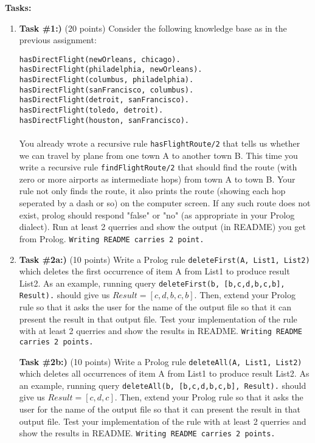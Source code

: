 \documentclass[paper=letter, fontsize=11pt]{scrartcl} %
\begin{document}
    \textbf{Tasks:}
    \begin{enumerate}


        \item \textbf{Task \#1:)} (20 points) Consider the following knowledge base as in the previous assignment:

        \texttt{hasDirectFlight(newOrleans, chicago).\\
        hasDirectFlight(philadelphia, newOrleans).\\
        hasDirectFlight(columbus, philadelphia).\\
        hasDirectFlight(sanFrancisco, columbus).\\
        hasDirectFlight(detroit, sanFrancisco).\\
        hasDirectFlight(toledo, detroit).\\
        hasDirectFlight(houston, sanFrancisco).\\
        } \\

        You already wrote a recursive rule \texttt{hasFlightRoute/2} that tells us whether we can travel by plane from one town A to another town B. 
This time you write a recursive rule \texttt{findFlightRoute/2} that should find the route (with zero or more airports as intermediate hops) 
from town A to town B. Your rule not only finds the route, it also prints the route 
(showing each hop seperated by a dash or so) on the computer screen. 
If any such route does not exist, prolog should respond "false" or "no" (as appropriate in your Prolog dialect). 
Run at least 2 querries and show the output (in README) you get from Prolog. \texttt{Writing README carries 2 point.} 

\item \textbf{Task \#2a:)} (10 points) Write a Prolog rule \texttt{deleteFirst(A, List1, List2)} 
which deletes the first occurrence of item A from List1 to produce result List2. 
As an example, running query \texttt{deleteFirst(b, [b,c,d,b,c,b], Result).} should give us $Result = [c, d, b, c, b]$. 
Then, extend your Prolog rule so that it asks the user for the name of the output file so 
that it can present the result in that output file. 
Test your implementation of the rule with at least 2 querries and show the results in README. \texttt{Writing README carries 2 points.}

\textbf{Task \#2b:)} (10 points) Write a Prolog rule \texttt{deleteAll(A, List1, List2)} 
which deletes all occurrences of item A from List1 to produce result List2. 
As an example, running query \texttt{deleteAll(b, [b,c,d,b,c,b], Result).} 
should give us $Result = [c, d, c]$. Then, extend your Prolog rule so that it asks the user for the name of the output file so that it can present the result in that output file. Test your implementation of the rule with at least 2 querries and show the results in README. \texttt{Writing README carries 2 points.}


\end{enumerate}
\end{document}
